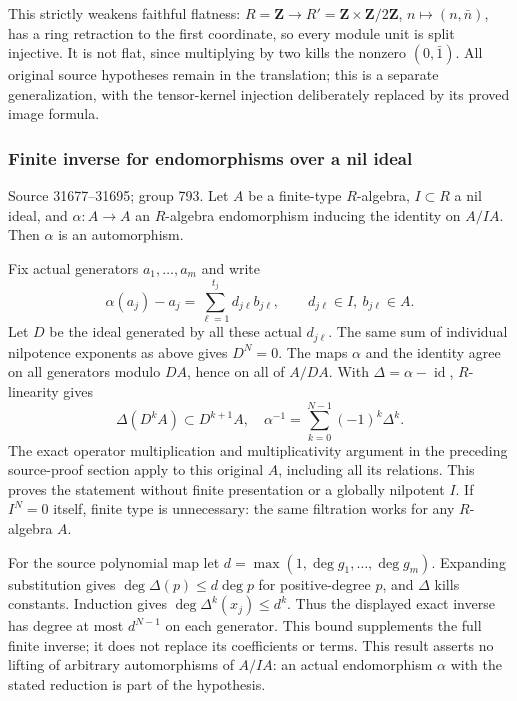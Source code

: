 This strictly weakens faithful flatness: \(R=\mathbf Z\to R'=\mathbf Z\times\mathbf Z/2\mathbf Z\), \(n\mapsto(n,\bar n)\), has a ring retraction to the first coordinate, so every module unit is split injective. It is not flat, since multiplying by two kills the nonzero \((0,\bar1)\). All original source hypotheses remain in the translation; this is a separate generalization, with the tensor-kernel injection deliberately replaced by its proved image formula.

\subsubsection{Finite inverse for endomorphisms over a nil ideal}\label{algebra-proof-035-finite-inverse-for-endomorphisms-over-a-nil-ideal}

Source 31677--31695; group 793. Let \(A\) be a finite-type \(R\)-algebra, \(I\subset R\) a nil ideal, and \(\alpha:A\to A\) an \(R\)-algebra endomorphism inducing the identity on \(A/IA\). Then \(\alpha\) is an automorphism.

Fix actual generators \(a_1,\ldots,a_m\) and write \[
\alpha(a_j)-a_j=\sum_{\ell=1}^{t_j}d_{j\ell}b_{j\ell},\qquad
d_{j\ell}\in I,\ b_{j\ell}\in A.
\] Let \(D\) be the ideal generated by all these actual \(d_{j\ell}\). The same sum of individual nilpotence exponents as above gives \(D^N=0\). The maps \(\alpha\) and the identity agree on all generators modulo \(DA\), hence on all of \(A/DA\). With \(\Delta=\alpha-\operatorname{id}\), \(R\)-linearity gives \[
\Delta(D^kA)\subset D^{k+1}A,\quad
\alpha^{-1}=\sum_{k=0}^{N-1}(-1)^k\Delta^k.
\] The exact operator multiplication and multiplicativity argument in the preceding source-proof section apply to this original \(A\), including all its relations. This proves the statement without finite presentation or a globally nilpotent \(I\). If \(I^N=0\) itself, finite type is unnecessary: the same filtration works for any \(R\)-algebra \(A\).

For the source polynomial map let \(d=\max(1,\deg g_1,\ldots,\deg g_m)\). Expanding substitution gives \(\deg\Delta(p)\le d\deg p\) for positive-degree \(p\), and \(\Delta\) kills constants. Induction gives \(\deg\Delta^k(x_j)\le d^k\). Thus the displayed exact inverse has degree at most \(d^{N-1}\) on each generator. This bound supplements the full finite inverse; it does not replace its coefficients or terms. This result asserts no lifting of arbitrary automorphisms of \(A/IA\): an actual endomorphism \(\alpha\) with the stated reduction is part of the hypothesis.

